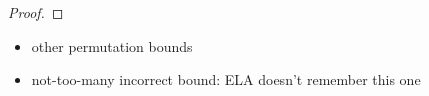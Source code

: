\begin{theorem}
\end{theorem}

\begin{proof}
\end{proof}

\begin{itemize}
\item other permutation bounds
\item not-too-many incorrect bound:  ELA doesn't remember this one
\end{itemize}





